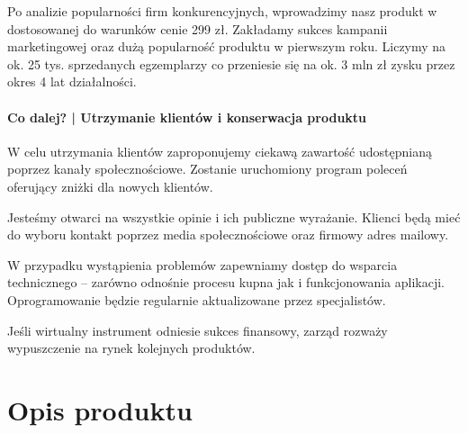 \documentclass[12pt]{article}
\newcommand{\productpricezl}{299 zł\xspace}
\begin{document}
Po analizie popularności firm konkurencyjnych, wprowadzimy nasz produkt w dostosowanej do warunków cenie \productpricezl.
Zakładamy sukces kampanii marketingowej oraz dużą popularność produktu w pierwszym roku.
Liczymy na ok. 25 tys. sprzedanych egzemplarzy co przeniesie się na ok. 3 mln zł zysku przez okres 4 lat działalności.

\paragraph{Co dalej? | Utrzymanie klientów i konserwacja produktu}

W celu utrzymania klientów zaproponujemy ciekawą zawartość udostępnianą poprzez kanały społecznościowe.
Zostanie uruchomiony program poleceń oferujący zniżki dla nowych klientów.

Jesteśmy otwarci na wszystkie opinie i ich publiczne wyrażanie.
Klienci będą mieć do wyboru kontakt poprzez media społecznościowe oraz firmowy adres mailowy.

W przypadku wystąpienia problemów zapewniamy dostęp do wsparcia technicznego -- zarówno odnośnie procesu kupna jak i funkcjonowania aplikacji.
Oprogramowanie będzie regularnie aktualizowane przez specjalistów.

Jeśli wirtualny instrument odniesie sukces finansowy, zarząd rozważy wypuszczenie na rynek kolejnych produktów.

\section{Opis produktu}



\end{document}
